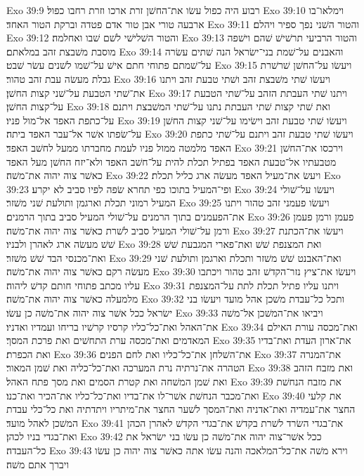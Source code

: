 Exo 39:9  רבוע היה כפול עשׂו את־החשׁן זרת ארכו וזרת רחבו כפול׃
Exo 39:10  וימלאו־בו ארבעה טורי אבן טור אדם פטדה וברקת הטור האחד׃
Exo 39:11  והטור השׁני נפך ספיר ויהלם׃
Exo 39:12  והטור השׁלישׁי לשׁם שׁבו ואחלמה׃
Exo 39:13  והטור הרביעי תרשׁישׁ שׁהם וישׁפה מוסבת משׁבצת זהב במלאתם׃
Exo 39:14  והאבנים על־שׁמת בני־ישׂראל הנה שׁתים עשׂרה על־שׁמתם פתוחי חתם אישׁ על־שׁמו לשׁנים עשׂר שׁבט׃
Exo 39:15  ויעשׂו על־החשׁן שׁרשׁרת גבלת מעשׂה עבת זהב טהור׃
Exo 39:16  ויעשׂו שׁתי משׁבצת זהב ושׁתי טבעת זהב ויתנו את־שׁתי הטבעת על־שׁני קצות החשׁן׃
Exo 39:17  ויתנו שׁתי העבתת הזהב על־שׁתי הטבעת על־קצות החשׁן׃
Exo 39:18  ואת שׁתי קצות שׁתי העבתת נתנו על־שׁתי המשׁבצת ויתנם על־כתפת האפד אל־מול פניו׃
Exo 39:19  ויעשׂו שׁתי טבעת זהב וישׂימו על־שׁני קצות החשׁן על־שׂפתו אשׁר אל־עבר האפד ביתה׃
Exo 39:20  ויעשׂו שׁתי טבעת זהב ויתנם על־שׁתי כתפת האפד מלמטה ממול פניו לעמת מחברתו ממעל לחשׁב האפד׃
Exo 39:21  וירכסו את־החשׁן מטבעתיו אל־טבעת האפד בפתיל תכלת להית על־חשׁב האפד ולא־יזח החשׁן מעל האפד כאשׁר צוה יהוה את־משׁה׃
Exo 39:22  ויעשׂ את־מעיל האפד מעשׂה ארג כליל תכלת׃
Exo 39:23  ופי־המעיל בתוכו כפי תחרא שׂפה לפיו סביב לא יקרע׃
Exo 39:24  ויעשׂו על־שׁולי המעיל רמוני תכלת וארגמן ותולעת שׁני משׁזר׃
Exo 39:25  ויעשׂו פעמני זהב טהור ויתנו את־הפעמנים בתוך הרמנים על־שׁולי המעיל סביב בתוך הרמנים׃
Exo 39:26  פעמן ורמן פעמן ורמן על־שׁולי המעיל סביב לשׁרת כאשׁר צוה יהוה את־משׁה׃
Exo 39:27  ויעשׂו את־הכתנת שׁשׁ מעשׂה ארג לאהרן ולבניו׃
Exo 39:28  ואת המצנפת שׁשׁ ואת־פארי המגבעת שׁשׁ ואת־מכנסי הבד שׁשׁ משׁזר׃
Exo 39:29  ואת־האבנט שׁשׁ משׁזר ותכלת וארגמן ותולעת שׁני מעשׂה רקם כאשׁר צוה יהוה את־משׁה׃
Exo 39:30  ויעשׂו את־ציץ נזר־הקדשׁ זהב טהור ויכתבו עליו מכתב פתוחי חותם קדשׁ ליהוה׃
Exo 39:31  ויתנו עליו פתיל תכלת לתת על־המצנפת מלמעלה כאשׁר צוה יהוה את־משׁה׃
Exo 39:32  ותכל כל־עבדת משׁכן אהל מועד ויעשׂו בני ישׂראל ככל אשׁר צוה יהוה את־משׁה כן עשׂו׃
Exo 39:33  ויביאו את־המשׁכן אל־משׁה את־האהל ואת־כל־כליו קרסיו קרשׁיו בריחו ועמדיו ואדניו׃
Exo 39:34  ואת־מכסה עורת האילם המאדמים ואת־מכסה ערת התחשׁים ואת פרכת המסך׃
Exo 39:35  את־ארון העדת ואת־בדיו ואת הכפרת׃
Exo 39:36  את־השׁלחן את־כל־כליו ואת לחם הפנים׃
Exo 39:37  את־המנרה הטהרה את־נרתיה נרת המערכה ואת־כל־כליה ואת שׁמן המאור׃
Exo 39:38  ואת מזבח הזהב ואת שׁמן המשׁחה ואת קטרת הסמים ואת מסך פתח האהל׃
Exo 39:39  את מזבח הנחשׁת ואת־מכבר הנחשׁת אשׁר־לו את־בדיו ואת־כל־כליו את־הכיר ואת־כנו׃
Exo 39:40  את קלעי החצר את־עמדיה ואת־אדניה ואת־המסך לשׁער החצר את־מיתריו ויתדתיה ואת כל־כלי עבדת המשׁכן לאהל מועד׃
Exo 39:41  את־בגדי השׂרד לשׁרת בקדשׁ את־בגדי הקדשׁ לאהרן הכהן ואת־בגדי בניו לכהן׃
Exo 39:42  ככל אשׁר־צוה יהוה את־משׁה כן עשׂו בני ישׂראל את כל־העבדה׃
Exo 39:43  וירא משׁה את־כל־המלאכה והנה עשׂו אתה כאשׁר צוה יהוה כן עשׂו ויברך אתם משׁה׃
